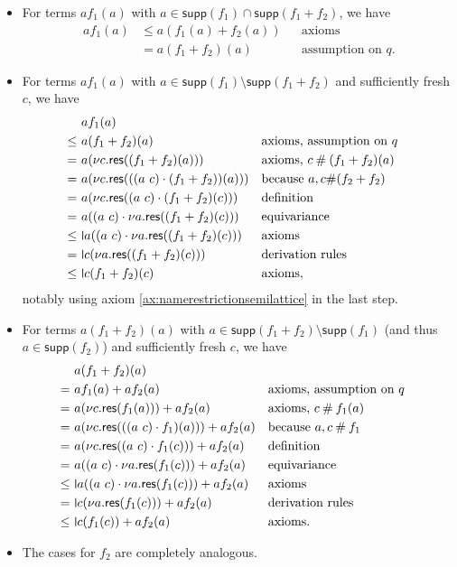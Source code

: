 \documentclass[a4paper,UKenglish,cleveref,thm-restate,numberwithinsect,final]{lipics-v2021}
\newcommand{\res}{\mathsf{res}}
\newcommand{\fresh}{\mathbin{\#}}
\newcommand{\supp}{\mathsf{supp}}
\theoremstyle{plain}
\newcommand{\midmid}{\hspace{0.2ex}{\rule[-0.1ex]{0.6pt}{1.65ex}}\hspace{0.2ex}}
\newcommand{\newletter}[1]{{\midmid}#1}
\numberwithin{equation}{section}
\newcommand{\+}[1]{\mathcal{#1}\xspace}
\theoremstyle{definition}
\begin{document}
\begin{itemize}
  \item For terms \(af_1(a)\) with \(a \in \supp(f_1) \cap \supp(f_1 + f_2)\), we have
    \begin{align*}
      af_1(a)
      &\le a(f_1(a) + f_2(a)) && \text{axioms} \\
      &= a(f_1 + f_2)(a) && \text{assumption on $q$}.
    \end{align*}
  \item For terms \(af_1(a)\) with \(a \in \supp(f_1) \setminus \supp(f_1 + f_2)\) and sufficiently fresh \(c\), we have
    \begin{align*}
      &af_1(a) \\
      \le~&a(f_1 + f_2)(a) && \text{axioms, assumption on $q$} \\
      =~&a(\nu c.\res((f_1 + f_2)(a))) && \text{axioms, } c\fresh(f_1 + f_2)(a) \\
      =~&a(\nu c.\res(((a\ c) \cdot (f_1 + f_2))(a))) && \text{because } a,c\#(f_2 + f_2) \\
      =~&a(\nu c.\res((a\ c) \cdot (f_1 + f_2)(c))) && \text{definition} \\
      =~&a((a\ c) \cdot \nu a.\res((f_1 + f_2)(c))) && \text{equivariance} \\
      \le~&\newletter{a}((a\ c) \cdot \nu a.\res((f_1 + f_2)(c))) && \text{axioms} \\
      =~&\newletter{c}(\nu a.\res((f_1 + f_2)(c))) && \text{derivation rules} \\
      \le~&\newletter{c}(f_1 + f_2)(c) && \text{axioms},
    \end{align*}
    notably using axiom \eqref{ax:namerestrictionsemilattice} in the last step.
  \item For terms \(a(f_1 + f_2)(a)\) with \(a \in \supp(f_1 + f_2) \setminus \supp(f_1)\) (and thus \(a \in \supp(f_2)\)) and sufficiently fresh \(c\), we have
    \begin{align*}
      &a(f_1 + f_2)(a) \\
      =~&af_1(a) + af_2(a) && \text{axioms, assumption on $q$} \\
      =~&a(\nu c.\res(f_1(a))) + af_2(a) && \text{axioms, }  c\fresh f_1(a) \\
      =~&a(\nu c.\res(((a\ c) \cdot f_1)(a))) + af_2(a) && \text{because } a,c\fresh f_1 \\
      =~&a(\nu c.\res((a\ c) \cdot f_1(c))) + af_2(a) && \text{definition} \\
      =~&a((a\ c) \cdot \nu a.\res(f_1(c))) + af_2(a) && \text{equivariance} \\
      \le~&\newletter{a}((a\ c) \cdot \nu a.\res(f_1(c))) + af_2(a) && \text{axioms} \\
      =~&\newletter{c}(\nu a.\res(f_1(c))) + af_2(a) && \text{derivation rules} \\
      \le~&\newletter{c}(f_1(c)) + af_2(a) && \text{axioms}.
    \end{align*}
  \item The cases for \(f_2\) are completely analogous.
\end{itemize}
\end{document}
